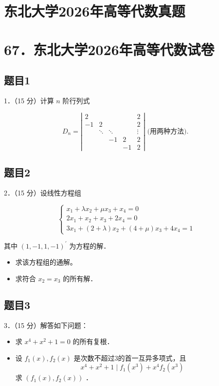 \documentclass{article}
\begin{document}
\section*{东北大学2026年高等代数真题}
\section*{67．东北大学2026年高等代数试卷}

\subsection{题目1}
1．（15 分）计算 \(n\) 阶行列式

\[
D_{n}=\left|\begin{array}{ccccc}
2 & & & & 2 \\
-1 & 2 & & & 2 \\
& \ddots & \ddots & & \vdots \\
& & -1 & 2 & 2 \\
& & & -1 & 2
\end{array}\right| \text { (用两种方法). }
\]

\subsection{题目2}
2．（15 分）设线性方程组

\[
\left\{\begin{array}{l}
x_{1}+\lambda x_{2}+\mu x_{3}+x_{4}=0 \\
2 x_{1}+x_{2}+x_{3}+2 x_{4}=0 \\
3 x_{1}+(2+\lambda) x_{2}+(4+\mu) x_{3}+4 x_{4}=1
\end{array}\right.
\]

其中 \((1,-1,1,-1)^{\prime}\) 为方程的解．

\begin{itemize}
  \item[（1）] 求该方程组的通解。
  \item[（2）] 求符合 \(x_{2}=x_{3}\) 的所有解．
\end{itemize}

\subsection{题目3}
3．（15 分）解答如下问题：

\begin{itemize}
  \item[（1）] 求 \(x^{4}+x^{2}+1=0\) 的所有复根．
  \item[（2）] 设 \(f_{1}(x), f_{2}(x)\) 是次数不超过3的首一互异多项式，且
\[
x^{4}+x^{2}+1 \mid f_{1}\left(x^{3}\right)+x^{4} f_{2}\left(x^{3}\right)
\]
求 \(\left(f_{1}(x), f_{2}(x)\right)\) ．
\end{itemize}
\end{document}
